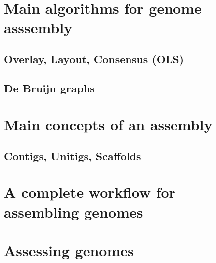 \documentclass[
  letterpaper,
]{scrbook}
\begin{document}
\hypertarget{main-algorithms-for-genome-asssembly}{%
\section*{Main algorithms for genome
asssembly}\label{main-algorithms-for-genome-asssembly}}

\hypertarget{overlay-layout-consensus-ols}{%
\subsection*{Overlay, Layout, Consensus
(OLS)}\label{overlay-layout-consensus-ols}}

\hypertarget{de-bruijn-graphs}{%
\subsection*{De Bruijn graphs}\label{de-bruijn-graphs}}

\hypertarget{main-concepts-of-an-assembly}{%
\section*{Main concepts of an
assembly}\label{main-concepts-of-an-assembly}}

\hypertarget{contigs-unitigs-scaffolds}{%
\subsection*{Contigs, Unitigs,
Scaffolds}\label{contigs-unitigs-scaffolds}}

\hypertarget{a-complete-workflow-for-assembling-genomes}{%
\section*{A complete workflow for assembling
genomes}\label{a-complete-workflow-for-assembling-genomes}}

\hypertarget{assessing-genomes}{%
\section*{Assessing genomes}\label{assessing-genomes}}
\end{document}
